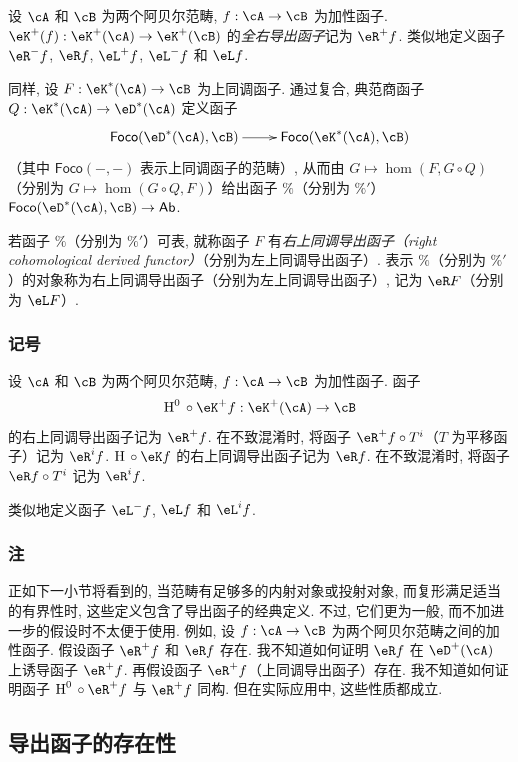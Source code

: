设 $\cA$ 和 $\cB$ 为两个阿贝尔范畴, $f:\cA\to \cB$ 为加性函子. $\eK^+(f):\eK^+(\cA) \to \eK^+(\cB)$ 的\emph{全右导出函子}记为 $\eR^+ f$. 类似地定义函子 $\eR^- f$, $\eR f$, $\eL^+ f$, $\eL^- f$ 和 $\eL f$.

同样, 设 $F:\eK^\ast(\cA) \to \cB$ 为上同调函子. 通过复合, 典范商函子 $Q:\eK^\ast(\cA) \to \eD^\ast(\cA)$ 定义函子
\[\xymatrix{
  \mathsf{Foco}(\eD^\ast(\cA),\cB) \ar[r]
    & \mathsf{Foco}(\eK^\ast(\cA),\cB)
}\]
（其中 $\mathsf{Foco}(-,-)$ 表示上同调函子的范畴）, 从而由 $G\mapsto \hom(F,G\circ Q)$（分别为 $G\mapsto \hom(G\circ Q,F)$）给出函子 $\%$（分别为 $\%'$）$\mathsf{Foco}(\eD^\ast(\cA),\cB) \to \mathsf{Ab}$.

\begin{definition}\label{VIII:4-1-4}
若函子 $\%$（分别为 $\%'$）可表, 就称函子 $F$ 有\emph{右上同调导出函子（right cohomological derived functor）}（分别为左上同调导出函子）. 表示 $\%$（分别为 $\%'$）的对象称为右上同调导出函子（分别为左上同调导出函子）, 记为 $\eR F$（分别为 $\eL F$）.
\end{definition}

\subsubsection{记号}\label{VIII:4-1-5}

设 $\cA$ 和 $\cB$ 为两个阿贝尔范畴, $f:\cA\to \cB$ 为加性函子. 函子
\[
  \h^0{}\circ \eK^+ f:\eK^+(\cA) \to \cB
\]
的右上同调导出函子记为 $\eR^+ f$. 在不致混淆时, 将函子 $\eR^+ f\circ T^i$（$T$ 为平移函子）记为 $\eR^i f$. $\h{}\circ \eK f$ 的右上同调导出函子记为 $\eR f$. 在不致混淆时, 将函子 $\eR f\circ T^i$ 记为 $\eR^i f$.

类似地定义函子 $\eL^- f$, $\eL f$ 和 $\eL^i f$.

\subsubsection{注}\label{VIII:4-1-6}

正如下一小节将看到的, 当范畴有足够多的内射对象或投射对象, 而复形满足适当的有界性时, 这些定义包含了导出函子的经典定义. 不过, 它们更为一般, 而不加进一步的假设时不太便于使用. 例如, 设 $f:\cA\to \cB$ 为两个阿贝尔范畴之间的加性函子. 假设函子 $\eR^+ f$ 和 $\eR f$ 存在. 我不知道如何证明 $\eR f$ 在 $\eD^+(\cA)$ 上诱导函子 $\eR^+ f$. 再假设函子 $\eR^+ f$（上同调导出函子）存在. 我不知道如何证明函子 $\h^0{}\circ \eR^+ f$ 与 $\eR^+ f$ 同构. 但在实际应用中, 这些性质都成立.

\subsection{导出函子的存在性}\label{VIII:4-2}

